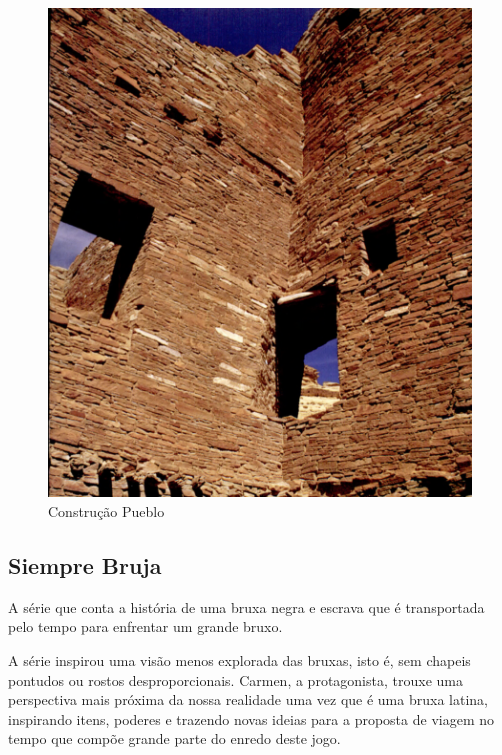 \begin{figure}[!htb] \caption{\label{fig_puebloan}Construção Pueblo} \begin{center}
\includegraphics[width=\textwidth]{imagens/puebloans.png} \end{center}
 \end{figure}

\clearpage

\subsection{Siempre Bruja}

A série que conta a história de uma bruxa negra e escrava que é transportada pelo tempo para enfrentar um grande bruxo.

A série inspirou uma visão menos explorada das bruxas, isto é, sem chapeis pontudos ou rostos desproporcionais. Carmen, a protagonista, trouxe uma perspectiva mais próxima da nossa realidade uma vez que é uma bruxa latina, inspirando itens, poderes e trazendo novas ideias para a proposta de viagem no tempo que compõe grande parte do enredo deste jogo.

